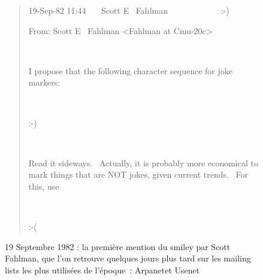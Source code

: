 \begin{figure}[h]
    \centering
    

    \begin{quote}
    19-Sep-82 11:44~~~ Scott E~ Fahlman~~~~~~~~~~~~ :-)

    From: Scott E~ Fahlman {\textless}Fahlman at Cmu-20c{\textgreater}

    ~
    
    I propose that the following character sequence for joke markers:

    ~~~~~~~ 

    :-)

    ~~~~~~~ 
    
    Read it sideways.~ Actually, it is probably more economical to mark things that are NOT jokes, given current trends.~ For this, use

    ~~~~~~~ 

    :-(

    \end{quote}
    \caption[la première mention du smiley par Scott Fahlman]{19 Septembre 1982 : la première mention du smiley par Scott Fahlman\protect\footnotemark, que l’on retrouve quelques jours plus tard sur les mailing lists les plus utilisées de l’époque : Arpanet\protect\footnotemark  et Usenet \protect\footnotemark}
    \label{fig:smiley-story}
\end{figure}


